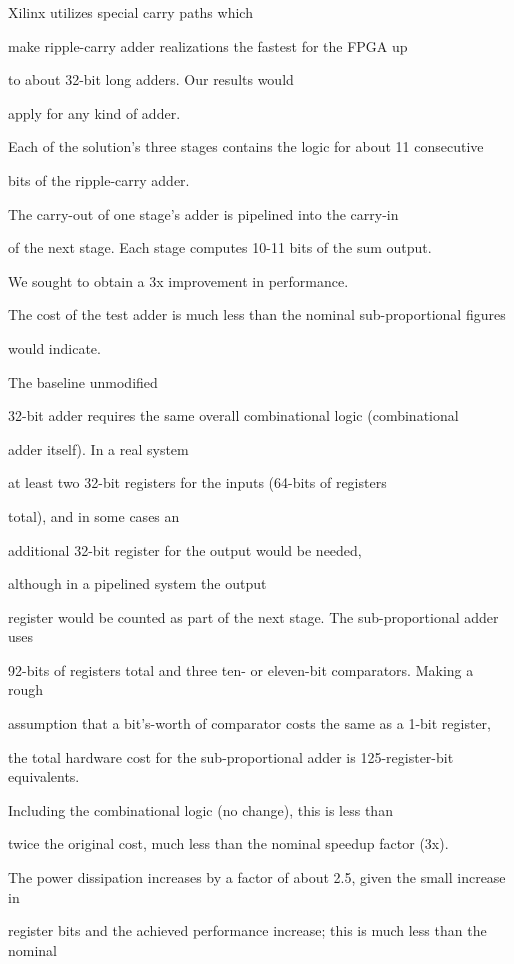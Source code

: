 \documentclass[12pt,dvips]{article}
\begin{document}
Xilinx utilizes special carry paths which

make ripple-carry adder realizations the fastest for the FPGA up

to about 32-bit long adders\cite{Xilinx99}. Our results would

apply for any kind of adder.



Each of the solution's three stages contains the logic for about 11 consecutive

bits of the ripple-carry adder. 

The carry-out of one stage's adder is pipelined into the carry-in

of the next stage. Each stage computes 10-11 bits of the sum output.

We sought to obtain a 3x improvement in performance.



The cost of the test adder is much less than the nominal sub-proportional figures

would indicate.

The baseline unmodified

32-bit adder requires the same overall combinational logic (combinational

adder itself). In a real system

at least two 32-bit registers for the inputs (64-bits of registers

total), and in some cases an

additional 32-bit register for the output would be needed,

although in a pipelined system the output

register would be counted as part of the next stage. The sub-proportional adder uses

92-bits of registers total and three ten- or eleven-bit comparators. Making a rough

assumption that a bit's-worth of comparator costs the same as a 1-bit register,

the total hardware cost for the sub-proportional adder is 125-register-bit equivalents.

Including the combinational logic (no change), this is less than

twice the original cost, much less than the nominal speedup factor (3x).

The power dissipation increases by a factor of about 2.5, given the small increase in

register bits and the achieved performance increase; this is much less than the nominal
\end{document}
